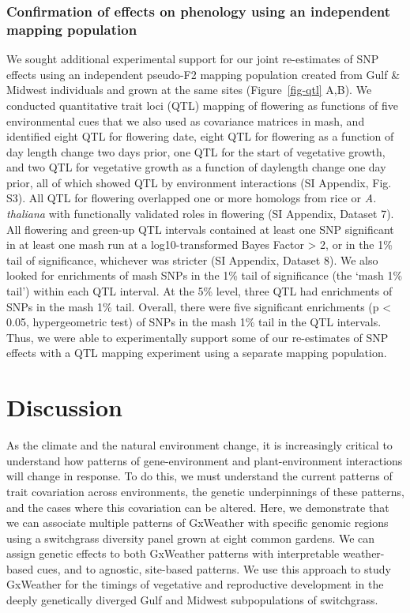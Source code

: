\documentclass[
  9pt,
  twocolumn,
  twoside]{pnas-new}
\begin{document}
\subsubsection{Confirmation of effects on phenology using an independent
mapping
population}\label{confirmation-of-effects-on-phenology-using-an-independent-mapping-population}

We sought additional experimental support for our joint re-estimates of
SNP effects using an independent pseudo-F2 mapping population created
from Gulf \& Midwest individuals and grown at the same sites
(Figure~\ref{fig-qtl} A,B). We conducted quantitative trait loci (QTL)
mapping of flowering as functions of five environmental cues that we
also used as covariance matrices in mash, and identified eight QTL for
flowering date, eight QTL for flowering as a function of day length
change two days prior, one QTL for the start of vegetative growth, and
two QTL for vegetative growth as a function of daylength change one day
prior, all of which showed QTL by environment interactions (SI Appendix,
Fig. S3). All QTL for flowering overlapped one or more homologs from
rice or \emph{A. thaliana} with functionally validated roles in
flowering (SI Appendix, Dataset 7). All flowering and green-up QTL
intervals contained at least one SNP significant in at least one mash
run at a log10-transformed Bayes Factor \textgreater{} 2, or in the 1\%
tail of significance, whichever was stricter (SI Appendix, Dataset 8).
We also looked for enrichments of mash SNPs in the 1\% tail of
significance (the `mash 1\% tail') within each QTL interval. At the 5\%
level, three QTL had enrichments of SNPs in the mash 1\% tail. Overall,
there were five significant enrichments (p \textless{} 0.05,
hypergeometric test) of SNPs in the mash 1\% tail in the QTL intervals.
Thus, we were able to experimentally support some of our re-estimates of
SNP effects with a QTL mapping experiment using a separate mapping
population.

\section{Discussion}\label{discussion}

As the climate and the natural environment change, it is increasingly
critical to understand how patterns of gene-environment and
plant-environment interactions will change in response. To do this, we
must understand the current patterns of trait covariation across
environments, the genetic underpinnings of these patterns, and the cases
where this covariation can be altered. Here, we demonstrate that we can
associate multiple patterns of GxWeather with specific genomic regions
using a switchgrass diversity panel grown at eight common gardens. We
can assign genetic effects to both GxWeather patterns with interpretable
weather-based cues, and to agnostic, site-based patterns. We use this
approach to study GxWeather for the timings of vegetative and
reproductive development in the deeply genetically diverged Gulf and
Midwest subpopulations of switchgrass.
\end{document}
